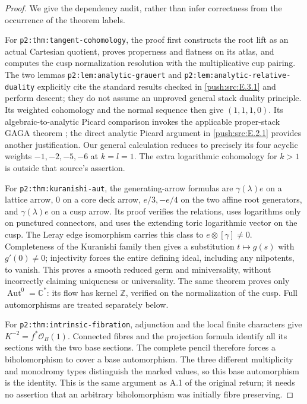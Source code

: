 \begin{proof}
We give the dependency audit, rather than infer correctness from
the occurrence of the theorem labels.

For \texttt{p2:thm:tangent-cohomology}, the proof first constructs
the root lift as an actual Cartesian quotient, proves properness
and flatness on its atlas, and computes the cusp normalization
resolution with the multiplicative cup pairing.  The two lemmas
\texttt{p2:lem:analytic-grauert} and
\texttt{p2:lem:analytic-relative-duality} explicitly cite the
standard results checked in \ref{push:src:E.3.1} and perform descent; they do
not assume an unproved general stack duality principle.  Its
weighted cohomology and the normal sequence then give
$(1,1,1,0)$.  Its algebraic-to-analytic Picard comparison invokes
the applicable proper-stack GAGA theorem
\cite[Theorem 7.4]{PY16push}; the direct analytic Picard
argument in \ref{push:src:E.2.1} provides another justification.  Our general
calculation reduces to precisely its four acyclic weights
$-1,-2,-5,-6$ at $k=l=1$.  The extra logarithmic cohomology
for $k>1$ is outside that source's assertion.

For \texttt{p2:thm:kuranishi-aut}, the generating-arrow formulas
are $\gamma(\lambda)e$ on a lattice arrow, $0$ on a core deck
arrow, $e/3,-e/4$ on the two affine root generators, and
$\gamma(\lambda)e$ on a cusp arrow.  Its proof verifies the
relations, uses logarithms only on punctured connectors, and
uses the extending toric logarithmic vector on the cusp.
The Leray edge isomorphism carries this class to
$e\otimes[\gamma]\ne0$.  Completeness of the Kuranishi family
then gives a substitution $t\mapsto g(s)$ with $g'(0)\ne0$;
injectivity forces the entire defining ideal, including any
nilpotents, to vanish.  This proves a smooth reduced germ and
miniversality, without incorrectly claiming uniqueness or
universality.  The same theorem proves only
$\operatorname{Aut}^0=\mathbb C^*$: its flow has kernel
$\mathbb Z$, verified on the normalization of the cusp.  Full
automorphisms are treated separately below.

For \texttt{p2:thm:intrinsic-fibration}, adjunction and the
local finite characters give $K^{-2}=f^*\mathcal O_B(1)$.
Connected fibres and the projection formula identify all its
sections with the two base sections.  The complete pencil
therefore forces a biholomorphism to cover a base automorphism.
The three different multiplicity and monodromy types distinguish
the marked values, so this base automorphism is the identity.
This is the same argument as A.1 of the original return; it
needs no assertion that an arbitrary biholomorphism was
initially fibre preserving.


\end{proof}
